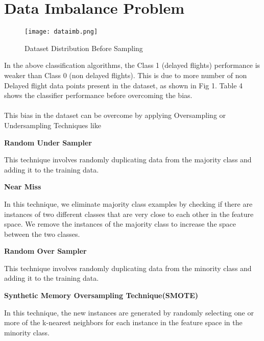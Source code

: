 \documentclass[12pt,letter-paper]{article}
\begin{document}
    
\section{Data Imbalance Problem}        

    \begin{figure}[H]%
        \begin{center}
          \texttt{[image: dataimb.png]}%
            \caption{Dataset Distribution Before Sampling}  
        \end{center}
    \end{figure}
    
    In the above classification algorithms, the Class 1 (delayed flights) performance is weaker than Class 0 (non delayed flights). This is due to more number of non Delayed flight data points present in the dataset, as shown in Fig 1. Table 4 shows the classifier performance before overcoming the bias.
    
    \paragraph{}
        This bias in the dataset can be overcome by applying Oversampling or Undersampling Techniques like
        \item\textbf{Random Under Sampler}
            
            This technique involves randomly duplicating data from the majority class and adding it to the training data.
            
        \item\textbf{Near Miss}
            
            In this technique, we eliminate majority class examples by checking if there are instances of two different classes that are very close to each other in the feature space. We remove the instances of the majority class to increase the space between the two classes.  
            
        \item\textbf{Random Over Sampler}
            
            This technique involves randomly duplicating data from the minority class and adding it to the training data.
        
        \item\textbf{Synthetic Memory Oversampling Technique(SMOTE)}
            
            In this technique, the new instances are generated by randomly selecting one or more of the k-nearest neighbors for each instance in the feature space in the minority class.
        
\end{document}

